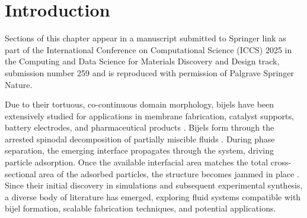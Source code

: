 \section{Introduction}

Sections of this chapter appear in a manuscript submitted to Springer link as part of the International Conference on Computational 
Science (ICCS) 2025 in the Computing and Data Science for Materials Discovery and Design track, submission number 259 and is
reproduced with permission of Palgrave Springer Nature. 


Due to their tortuous, co-continuous domain morphology, bijels have been 
extensively studied for applications in membrane fabrication, catalyst supports, battery electrodes, and pharmaceutical 
products \cite{yabuno_preparation_2020, samdani_bicontinuous_2017, cha_bicontinuous_2019, garcia_scalable_2019, santiago_cordoba_aerobijels_2020}.  
Bijels form through the arrested spinodal decomposition of partially miscible fluids 
\cite{stratford_colloidal_2005, herzig_bicontinuous_2007, tavacoli_novel_2011}. During phase separation, the emerging interface propagates 
through the system, driving particle adsorption. Once the available interfacial area matches the total cross-sectional area of the adsorbed 
particles, the structure becomes jammed in place \cite{stratford_colloidal_2005, herzig_bicontinuous_2007, tavacoli_novel_2011}. Since their 
initial discovery in simulations and subsequent experimental synthesis, a diverse body of literature has emerged, exploring fluid systems 
compatible with bijel formation, scalable fabrication techniques, and potential applications.

